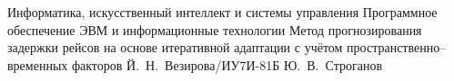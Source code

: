 \documentclass{bmstu}
\begin{document}
    \makethesistitle
    {Информатика, искусственный интеллект и системы управления} %
    {Программное обеспечение ЭВМ и информационные технологии} %
    {Метод прогнозирования задержки рейсов на основе итеративной адаптации с учётом пространственно--временных факторов} %
    {Й.~Н.~Везирова/ИУ7И-81Б} %
    {Ю.~В.~Строганов} %
    {} %
    {} %

    \setcounter{page}{3}

%    

%    

    \maketableofcontents

%    
%    

    
    
    
%    
%    
%    

    \makebibliography

%    

%    
\end{document}

